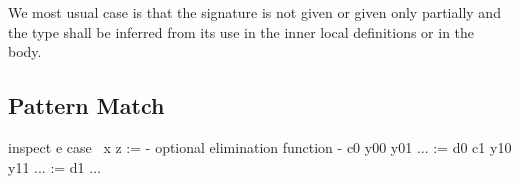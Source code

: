 We most usual case is that the signature is not given or given only partially
and the type shall be inferred from its use in the inner local definitions or in
the body.





\subsection{Pattern Match}


\begin{alba}
    inspect e case
        {\ {x} z :=
            {- optional elimination function -}
        }
        c0 y00 y01 ... := d0
        c1 y10 y11 ... := d1
        ...
\end{alba}





